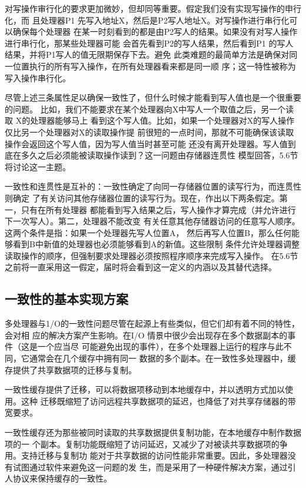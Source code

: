对写操作审行化的要求更加微妙，但却同等重要。假定我们没有实现写操作的申行化，而
且处理器P1 先写入地址X，然后是P2写人地址X。对写操作进行串行化可以确保每个处理器
在某一时刻看到的都是由P2写人的结果。如果没有对写人操作进行串行化，那某些处理器可能
会首先看到P2的写人结果，然后看到P1 的写人结果，并将P1写人的值无限期保存下去。避免
此类难题的最简单方法是确保对同一位置执行的所有写入操作，在所有处理器看来都是同一顺
序；这一特性被称为写入操作串行化。

尽管上述三条属性足以确保一致性了，但什么时候才能看到写人值也是一个很重要的问题。
比如，我们不能要求在某个处理器向X中写人一个取值之后，另一个读取 X的处理器能够马上
看到这个写人值。比如，如果一个处理器对X的写人操作仅比另一个处理器对X的读取操作提
前很短的一点时间，那就不可能确保该读取操作会返回这个写人值，因为写人值当时甚至可能
还没有离开处理器。写人值到底在多久之后必须能被读取操作读到？这一问题由存储器连贯性
模型回答，5.6节将讨论这一主题。

一致性和连贯性是互补的：一致性确定了向同一存储器位置的读写行为，而连贯性则确定
了有关访问其他存储器位置的读写行为。现在，作出以下两条假定。第一，只有在所有处理器
都能看到写入结果之后，写人操作才算完成（并允许进行下一次写人）。第二，处理器不能改变
有关任意其他存储器访问的任意写人顺序。这两个条件是指：如果一个处理器先写人位置A，
然后再写人位置B，那么任何能够看到B中新值的处理器也必须能够看到A的新值。这些限制
条件允许处理器调整读取操作的顺序，但强制要求处理器必须按照程序顺序来完成写入操作。
在5.6节之前将一直采用这一假定，届时将会看到这一定义的内涵以及其替代选择。

\subsection{一致性的基本实现方案}
多处理器与1/O的一致性问题尽管在起源上有些类似，但它们却有着不同的特性，会对相
应的解决方案产生影响。在I/O 情景中很少会出现存在多个数据副本的事件（这是一个应当尽
可能避免出现的事件），在多个处理器上运行的程序与此不同，它通常会在几个缓存中拥有同一
数据的多个副本。在一致性多处理器中，缓存提供了共享数据项的迁移与复制。

一致性缓存提供了迁移，可以将数据项移动到本地缓存中，并以透明方式加以使用。这种
迁移既缩短了访问远程共享数据项的延迟，也降低了对共享存储器的带宽要求。

一致性缓存还为那些被同时读取的共享数据提供复制功能，在本地缓存中制作数据项的一
个副本。复制功能既缩短了访问延迟，又减少了对被读共享数据项的争用。支持迁移与复制功
能对于共享数据的访问性能非常重要。因此，多处理器没有试图通过软件来避免这一问题的发
生，而是采用了一种硬件解决方案，通过引人协议来保持缓存的一致性。


